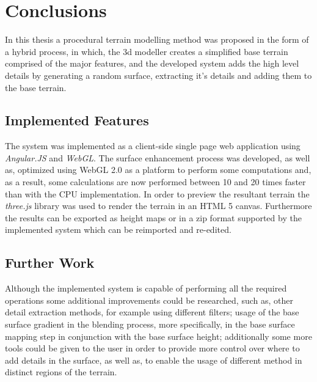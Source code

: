 \chapter{Conclusions} \label{chap:conclusions}
  
  In this thesis a procedural terrain modelling method was proposed in the form of a hybrid process, in which, the 3d modeller creates a simplified base terrain comprised of the major features, and the developed system adds the high level details by generating a random surface, extracting it's details and adding them to the base terrain. 
  
  \section {Implemented Features}
  
    The system was implemented as a client-side single page web application using \textit{Angular.JS} and \textit{WebGL}. The surface enhancement process was developed, as well as, optimized using WebGL 2.0 as a platform to perform some computations and, as a result, some calculations are now performed between 10 and 20 times faster than with the CPU implementation. In order to preview the resultant terrain the \textit{three.js} library was used to render the terrain in an HTML 5 canvas. Furthermore the results can be exported as height maps or in a zip format supported by the implemented system which can be reimported and re-edited.
  
  \section {Further Work}
  
    Although the implemented system is capable of performing all the required operations some additional improvements could be researched, such as, other detail extraction methods, for example using different filters; usage of the base surface gradient in the blending process, more specifically, in the base surface mapping step in conjunction with the base surface height; additionally some more tools could be given to the user in order to provide more control over where to add details in the surface, as well as, to enable the usage of different method in distinct regions of the terrain.
    
    
